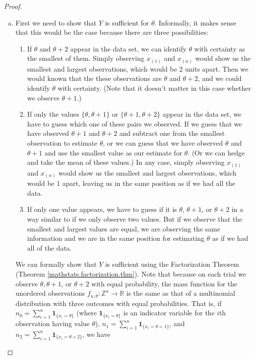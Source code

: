 \begin{proof}

\begin{enumerate}[(a)]

\item First we need to show that \(Y\) is sufficient for \(\theta\). Informally, it makes sense that this would be the case because there are three possibilities:

\begin{enumerate}[(1)]

\item If \(\theta\) and \(\theta + 2\) appear in the data set, we can identify \(\theta\) with certainty as the smallest of them. Simply observing \(x_{(1)}\) and \(x_{(n)}\) would show us the smallest and largest observations, which would be 2 units apart. Then we would known that the these observations are \(\theta\) and \(\theta + 2\), and we could identify \(\theta\) with certainty. (Note that it doesn't matter in this case whether we observe \(\theta + 1\).)

\item If only the values \(\{\theta, \theta + 1\}\) or \(\{ \theta + 1, \theta + 2\}\) appear in the data set, we have to guess which one of these pairs we observed. If we guess that we have observed \(\theta + 1\) and \(\theta + 2\) and subtract one from the smallest observation to estimate \(\theta\), or we can guess that we have observed \(\theta\) and \(\theta + 1\) and use the smallest value as our estimate for \(\theta\). (Or we can hedge and take the mean of these values.) In any case, simply observing \(x_{(1)}\) and \(x_{(n)}\) would show us the smallest and largest observations, which would be 1 apart, leaving us in the same position as if we had all the data.

\item If only one value appears, we have to guess if it is \(\theta\), \(\theta+ 1\), or \(\theta + 2\) in a way similar to if we only observe two values. But if we observe that the smallest and largest values are equal, we are observing the same information and we are in the same position for estimating \(\theta\) as if we had all of the data.

\end{enumerate}


We can formally show that \(Y\) is sufficient using the Factorization Theorem (Theorem \ref{mathstats.factorization.thm}). Note that because on each trial we observe \(\theta, \theta+1 \), or \(\theta + 2\) with equal probability, the mass function for the unordered observations \(f_{u,\theta}: \mathbb{Z}^n \to \mathbb{R}\) is the same as that of a multinomial distribution with three outcomes with equal probabilities. That is, if \(n_0 = \sum_{i=1}^n \boldsymbol{1}_{\{x_i = \theta\}}\) (where \(\boldsymbol{1}_{\{x_i = \theta\}}\) is an indicator variable for the \(i\)th observation having value \(\theta\)), \(n_1 = \sum_{i=1}^n \boldsymbol{1}_{\{x_i = \theta = 1\}}\), and \(n_2 = \sum_{i=1}^n \boldsymbol{1}_{\{x_i = \theta + 2\}}\), we have


\end{enumerate}
\end{proof}
